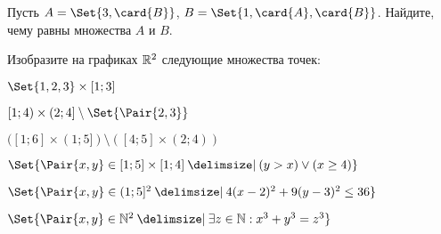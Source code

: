 \documentclass[a4paper,12pt]{article}
\begin{document}
\begin{tasks}
    \item Пусть $A = \Set{3, \card{B}}$, $B = \Set{1, \card{A}, \card{B}}$.
    Найдите, чему равны множества $A$ и $B$.


    \item Изобразите на графиках $\mathbb{R}^2$ следующие множества точек:

    \begin{multicols}{2}
    \begin{subtasks}
        \item $\Set{1,2,3} \times [1; 3]$
        \item $[1; 4) \times (2; 4] \setminus \Set{\Pair{2, 3}}$
        \item $([1; 6] \times (1; 5]) \setminus ([4; 5] \times (2; 4))$
        \item $\Set{\Pair{x, y} \in [1; 5] \times [1; 4] \given (y > x) \lor (x \geq 4)}$
        \item $\Set{\Pair{x, y} \in (1;5]^2 \given 4(x-2)^2 + 9(y-3)^2 \leq 36}$
        \item $\Set{\Pair{x, y} \in \Natural^2 \given \exists z \in \Natural : x^3 + y^3 = z^3}$
    \end{subtasks}
    \end{multicols}

\end{tasks}
\end{document}
